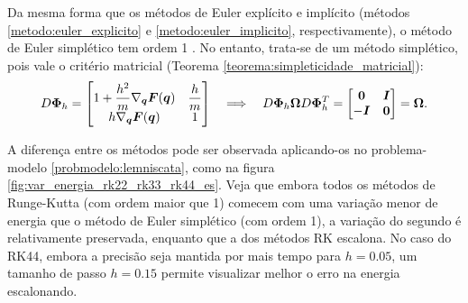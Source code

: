 Da mesma forma que os métodos de Euler explícito e implícito (métodos \ref{metodo:euler_explicito} e \ref{metodo:euler_implicito}, respectivamente), o método de Euler simplético tem ordem 1 \citep[189]{Hairer2006-oz}. No entanto, trata-se de um método simplético, pois vale o critério matricial (Teorema \ref{teorema:simpleticidade_matricial}):
\begin{equation*}
    D \bm \Phi_h = \begin{bmatrix}
        1 + \dfrac{h^2}{m} \nabla_{\bm q} \bm F(\bm q) & \dfrac{h}{m} \\
        h \nabla_{\bm q} \bm F(\bm q) & 1
    \end{bmatrix}
    \quad
    \Longrightarrow
    \quad
    D \bm \Phi_h \bm \Omega D \bm \Phi_h^T = \begin{bmatrix}
        \bm 0 & \bm I \\ - \bm I & \bm 0
    \end{bmatrix}
    = \bm \Omega.
\end{equation*}

A diferença entre os métodos pode ser observada aplicando-os no problema-modelo \ref{probmodelo:lemniscata}, como na figura \ref{fig:var_energia_rk22_rk33_rk44_es}. Veja que embora todos os métodos de Runge-Kutta (com ordem maior que 1) comecem com uma variação menor de energia que o método de Euler simplético (com ordem 1), a variação do segundo é relativamente preservada, enquanto que a dos métodos RK escalona. No caso do RK44, embora a precisão seja mantida por mais tempo para $h=0.05$, um tamanho de passo $h=0.15$ permite visualizar melhor o erro na energia escalonando.

